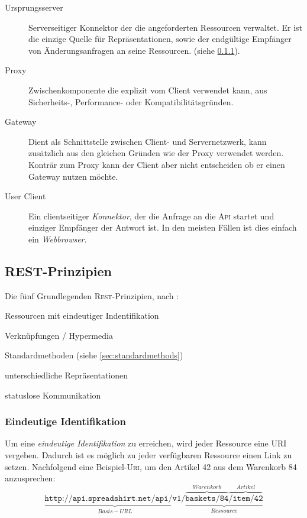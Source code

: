 \begin{description}
    \item[Ursprungsserver] 
        Serverseitiger Konnektor der die angeforderten Ressourcen verwaltet. Er ist die einzige Quelle für Repräsentationen, sowie der endgültige Empfänger von Änderungsanfragen an seine Ressourcen. (siehe \cref{sec:unambigiousidentification}).
    \item[Proxy] Zwischenkomponente die explizit vom Client verwendet kann, aus Sicherheits-, Performance- oder Kompatibilitätsgründen.
    \item[Gateway] Dient als Schnittstelle zwischen Client- und Servernetzwerk, kann zusätzlich aus den gleichen Gründen wie der Proxy verwendet werden. Konträr zum Proxy kann der Client aber nicht entscheiden ob er einen Gateway nutzen möchte.
    \item[User Client] 
        Ein clientseitiger \emph{Konnektor}, der die Anfrage an die \textsc{Api} startet und einziger Empfänger der Antwort ist. In den meisten Fällen ist dies einfach ein \emph{Webbrowser}.
\end{description}

\subsection{REST-Prinzipien}

Die fünf Grundlegenden \textsc{Rest}-Prinzipien, nach \cite[11 ff.]{Tilkov09}:
\begin{compactitem}
    \item Ressourcen mit eindeutiger Indentifikation
    \item Verknüpfungen / Hypermedia
    \item Standardmethoden (siehe \cref{sec:standardmethods})
    \item unterschiedliche Repräsentationen
    \item statuslose Kommunikation
\end{compactitem}

\subsubsection{Eindeutige Identifikation}
\label{sec:unambigiousidentification}

Um eine \emph{eindeutige Identifikation} zu erreichen, wird jeder Ressource eine \gls{URI} vergeben. Dadurch ist es möglich zu jeder verfügbaren Ressource einen Link zu setzen. 
Nachfolgend eine Beispiel-\textsc{Uri}, um den Artikel 42 aus dem Warenkorb 84 anzusprechen:
\[
    \underbrace{\texttt{http://api.spreadshirt.net/api/v1/}}_{Basis-URL}\underbrace{\overbrace{\texttt{baskets/84}}^{Warenkorb}\overbrace{\texttt{/item/42}}^{Artikel}}_{Ressource}
    \label{RESTexampleURL}
\]

